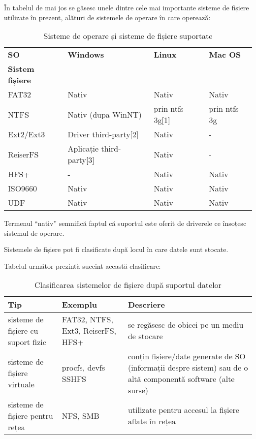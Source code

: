 În tabelul de mai jos se găsesc unele dintre cele mai importante sisteme de
fișiere utilizate în prezent, alături de sistemele de operare în care operează:

\begin{table}[htb]
\caption{Sisteme de operare și sisteme de fișiere suportate}
\begin{center}
	\begin{tabular}{ | p{} | p{} | p{} | p{} | }
	\hline
		\textbf{SO} & \textbf{Windows} & \textbf{Linux} & \textbf{Mac OS} \\
		\textbf{Sistem fișiere} & & & \\
	\hline
		FAT32 & Nativ & Nativ & Nativ \\
	\hline
		NTFS & Nativ (dupa WinNT) & prin ntfs-3g[1] & prin ntfs-3g \\
	\hline
		Ext2/Ext3 & Driver third-party[2] & Nativ & - \\
	\hline
		ReiserFS & Aplicație third-party[3] & Nativ & - \\
	\hline
		HFS+ & - & Nativ & Nativ \\
	\hline
		ISO9660 & Nativ & Nativ & Nativ \\
	\hline
		UDF & Nativ & Nativ & Nativ \\
	\hline
	\end{tabular}
	\label{table:file-system-backup-fs-types}
\end{center}
\end{table}

Termenul “nativ” semnifică faptul că suportul este oferit de driverele ce
însoțesc sistemul de operare.

Sistemele de fișiere pot fi clasificate după locul în care datele sunt stocate.

Tabelul următor prezintă succint această clasificare:

\begin{table}[htb]
\caption{Clasificarea sistemelor de fișiere după suportul datelor}
\begin{center}
	\begin{tabular}{ | p{} | p{} | p{} | }
	\hline
		\textbf{Tip} & \textbf{Exemplu} & \textbf{Descriere} \\
	\hline
		sisteme de fișiere cu suport fizic & 	FAT32, NTFS, Ext3, ReiserFS, HFS+ & se
		regăsesc de obicei pe un mediu de stocare \\
	\hline
		sisteme de fișiere virtuale & 	procfs, devfs SSHFS & conțin fișiere/date generate
		de SO (informații despre sistem) sau de o altă componentă software (alte surse) \\
	\hline
		sisteme de fișiere pentru rețea & 	NFS, SMB & utilizate pentru accesul la
		fișiere aflate în rețea \\
	\hline
	\end{tabular}
	\label{table:file-system-fs-classes}
\end{center}
\end{table}

